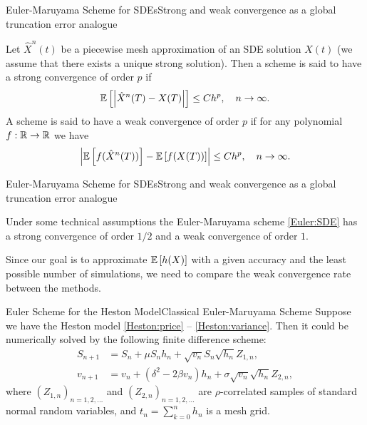 \begin{frame}{Euler-Maruyama Scheme for SDEs}{Strong and weak convergence as a global truncation error analogue}
    \begin{definition}
        Let $\hat X^n(t)$ be a piecewise mesh approximation of an SDE solution $X(t)$ (we assume that there exists a unique strong solution). 
        Then a scheme is said to have a strong convergence of order $p$ if 
        \begin{equation}
            \mathbb{E}\left[\left|\hat X^n(T) - X(T)\right|\right] \leq Ch^p, \quad n \to \infty.
        \end{equation}
        A scheme is said to have a weak convergence of order $p$ if for any polynomial $f: \mathbb{R} \to \mathbb{R}$ we have
        \begin{equation}
            \left|\mathbb{E}\left[f(\hat X^n(T))\right] - \mathbb{E}\left[f(X(T))\right]\right| \leq Ch^p, \quad n \to \infty.
        \end{equation}
    \end{definition}
    
\end{frame}

\begin{frame}{Euler-Maruyama Scheme for SDEs}{Strong and weak convergence as a global truncation error analogue}
    \begin{theorem}
        Under some technical assumptions the Euler-Maruyama scheme \eqref{Euler:SDE} has a strong convergence of order $1/2$ and a weak convergence of order $1$.
    \end{theorem}

    \begin{nb}
        Since our goal is to approximate $\mathbb{E}\left[h(X)\right]$ with a given accuracy and the least possible number of simulations, we need to compare the weak convergence rate between the methods.
    \end{nb}
\end{frame}

\begin{frame}{Euler Scheme for the Heston Model}{Classical Euler-Maruyama Scheme}
    Suppose we have the Heston model \eqref{Heston:price} -- \eqref{Heston:variance}. Then it could be numerically solved by the following finite difference scheme:
    \begin{align}
        S_{n+1} & = S_n + \mu S_n h_n + \sqrt{v_n} S_n \sqrt{h_n} Z_{1,n}, \label{Euler:Heston:price}\\
        v_{n+1} & = v_n + \left(\delta^2 - 2\beta v_n\right) h_n + \sigma \sqrt{v_n} \sqrt{h_n} Z_{2,n}, \label{Euler:Heston:variance}
    \end{align}
    where $(Z_{1,n})_{n=1, 2, \dots}$ and $(Z_{2,n})_{n=1, 2, \dots}$ are $\rho$-correlated samples of standard normal random variables, and $t_n = \sum_{k=0}^n h_n$ is a mesh grid.
\end{frame}

